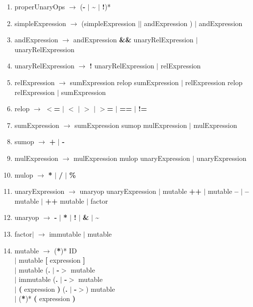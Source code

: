 \documentclass{article}
\begin{document}
\begin{enumerate}
\item properUnaryOps $\rightarrow$
    (\textbf{-} $|$ \textbf{\~} $|$ \textbf{!})*

\item simpleExpression $\rightarrow$ 
    (simpleExpression \textbf{$||$} andExpression )
    $|$ andExpression

\item andExpression $\rightarrow$ 
    andExpression \textbf{\&\&} unaryRelExpression 
    $|$ unaryRelExpression

\item unaryRelExpression $\rightarrow$ 
    \textbf{!} unaryRelExpression 
    $|$ relExpression

\item relExpression $\rightarrow$ 
    sumExpression relop sumExpression 
    $|$ relExpression relop relExpression 
    $|$ sumExpression

\item relop $\rightarrow$ 
    \textbf{$<$=} 
    $|$ \textbf{$<$} 
    $|$ \textbf{$>$} 
    $|$ \textbf{$>$=} 
    $|$ \textbf{==} 
    $|$ \textbf{!=}

\item sumExpression $\rightarrow$ 
    sumExpression sumop mulExpression 
    $|$ mulExpression

\item sumop $\rightarrow$ 
    \textbf{+} $|$ \textbf{-}

\item mulExpression $\rightarrow$ 
    mulExpression mulop unaryExpression 
    $|$ unaryExpression

\item mulop $\rightarrow$ 
    \textbf{*} $|$ \textbf{/} $|$ \textbf{\%}

\item unaryExpression $\rightarrow$ 
    unaryop unaryExpression 
    $|$ mutable \textbf{++} 
    $|$ mutable \textbf{--} 
    $|$ \textbf{--} mutable 
    $|$ \textbf{++} mutable 
    $|$ factor 

\item unaryop $\rightarrow$ 
    \textbf{-} $|$ \textbf{*} $|$ \textbf{!} $|$ \textbf{\&} $|$ \textbf{\~}

\item factor$|$ $\rightarrow$ 
    immutable $|$ mutable

\item mutable $\rightarrow$ 
    (\textbf{*})* ID \\
    $|$ mutable \textbf{[} expression \textbf{]}\\
    $|$ mutable (\textbf{.} $|$ \textbf{-$>$} mutable\\
    $|$ immutable (\textbf{.} $|$ \textbf{-$>$} mutable\\
    $|$ \textbf{(} expression \textbf{)} (\textbf{.} $|$ \textbf{-$>$}) mutable\\
    $|$ (\textbf{*})* \textbf{(} expression \textbf{)}


\end{enumerate}
\end{document}
